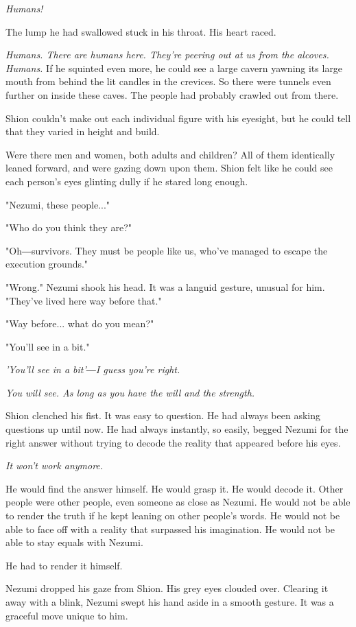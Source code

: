 \emph{Humans!}

The lump he had swallowed stuck in his throat. His heart raced.

\emph{Humans. There are humans here. They're peering out at us from the
	alcoves. Humans.} If he squinted even more, he could see a large cavern
yawning its large mouth from behind the lit candles in the crevices. So
there were tunnels even further on inside these caves. The people had
probably crawled out from there.

Shion couldn't make out each individual figure with his eyesight, but he
could tell that they varied in height and build.

Were there men and women, both adults and children? All of them
identically leaned forward, and were gazing down upon them. Shion felt
like he could see each person's eyes glinting dully if he stared long
enough.

"Nezumi, these people..."

"Who do you think they are?"

"Oh―survivors. They must be people like us, who've managed to escape the
execution grounds."

"Wrong." Nezumi shook his head. It was a languid gesture, unusual for
him. "They've lived here way before that."

"Way before... what do you mean?"

"You'll see in a bit."

\emph{'You'll see in a bit'―I guess you're right.}

\emph{You will see. As long as you have the will and the strength.}

Shion clenched his fist. It was easy to question. He had always been
asking questions up until now. He had always instantly, so easily,
begged Nezumi for the right answer without trying to decode the reality
that appeared before his eyes.

\emph{It won't work anymore.}

He would find the answer himself. He would grasp it. He would decode it.
Other people were other people, even someone as close as Nezumi. He
would not be able to render the truth if he kept leaning on other
people's words. He would not be able to face off with a reality that
surpassed his imagination. He would not be able to stay equals with
Nezumi.

He had to render it himself.

Nezumi dropped his gaze from Shion. His grey eyes clouded over. Clearing
it away with a blink, Nezumi swept his hand aside in a smooth gesture.
It was a graceful move unique to him.

